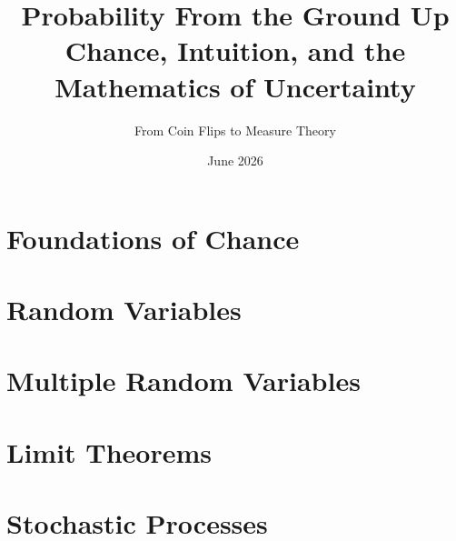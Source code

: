 \documentclass[11pt]{book}
\title{\textbf{Probability From the Ground Up}\\[0.4em]\large Chance, Intuition, and the Mathematics of Uncertainty}
\author{From Coin Flips to Measure Theory}
\date{June 2026}
\begin{document}
\frontmatter
\maketitle

\tableofcontents

\mainmatter

\part{Foundations of Chance}






\part{Random Variables}








\part{Multiple Random Variables}







\part{Limit Theorems}





\part{Stochastic Processes}







\end{document}

